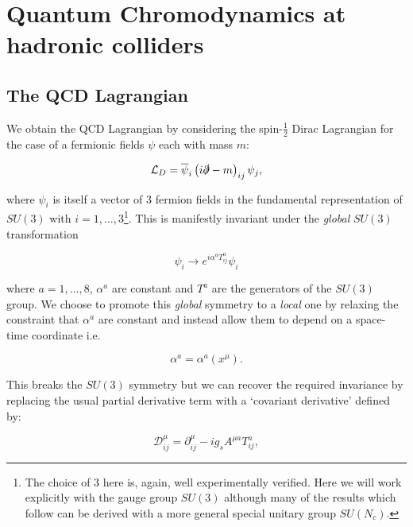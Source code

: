 \chapter{Quantum Chromodynamics at hadronic colliders}
\label{chap:theory}

\section{The QCD Lagrangian}

	We obtain the QCD Lagrangian by considering the spin-$\frac{1}{2}$ Dirac Lagrangian for the case of a
	fermionic fields $\psi$ each with mass $m$:

	\begin{equation}
		\mathcal{L}_D = \overline{\psi}_i\left(i\slashed{\partial}- m\right)_{ij}\psi_j,
		\label{eqn:QCDLagrangian}
	\end{equation}

	\noindent where $\psi_i$ is itself a vector of 3 fermion fields in the fundamental
	representation of $SU(3)$ with $i=1,\ldots,3$\footnote{The choice of 3 here is, again, well experimentally verified.
	Here we will work explicitly with the gauge group $SU(3)$ although many of the results which follow can
	be derived with a more general special unitary group $SU(N_c)$.}. This is manifestly invariant under the \emph{global}
	$SU(3)$ transformation

	\begin{equation}
		\psi_i\rightarrow e^{i\alpha^aT^a_{ij}}\psi_i
	\end{equation}

	\noindent where $a=1,\ldots,8$, $\alpha^a$ are constant and $T^a$ are the generators of the $SU(3)$ group.
	We choose to promote this \emph{global} symmetry to a \emph{local} one by relaxing the constraint that $\alpha^a$ are
	constant and instead allow them to depend on a space-time coordinate i.e.

	\begin{equation}
		\alpha^a = \alpha^a(x^\mu).
	\end{equation}

	This breaks the $SU(3)$ symmetry but we can recover the required invariance by replacing the
	usual partial derivative term with a `covariant derivative' defined by:

	\begin{equation}
		\mathcal{D}^\mu_{ij} = \partial^\mu_{ij} - ig_sA^{\mu a}T^a_{ij},
	\end{equation}


